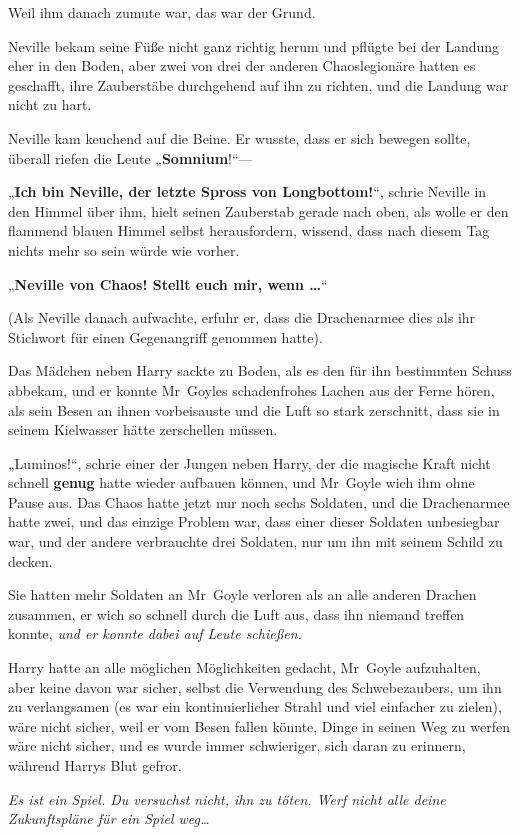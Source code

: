 {Weil ihm danach zumute war, das war der Grund.

Neville bekam seine Füße nicht ganz richtig herum und pflügte bei der Landung eher in den Boden, aber zwei von drei der anderen Chaoslegionäre hatten es geschafft, ihre Zauberstäbe durchgehend auf ihn zu richten, und die Landung war nicht zu hart.

Neville kam keuchend auf die Beine. Er wusste, dass er sich bewegen sollte, überall riefen die Leute „\textbf{Somnium}!“—

„\textbf{Ich bin Neville, der letzte Spross von Longbottom!}“, schrie Neville in den Himmel über ihm, hielt seinen Zauberstab gerade nach oben, als wolle er den flammend blauen Himmel selbst herausfordern, wissend, dass nach diesem Tag nichts mehr so sein würde wie vorher.

„\textbf{Neville von Chaos! Stellt euch mir, wenn …}“

(Als Neville danach aufwachte, erfuhr er, dass die Drachenarmee dies als ihr Stichwort für einen Gegenangriff genommen hatte).

Das Mädchen neben Harry sackte zu Boden, als es den für ihn bestimmten Schuss abbekam, und er konnte Mr~Goyles schadenfrohes Lachen aus der Ferne hören, als sein Besen an ihnen vorbeisauste und die Luft so stark zerschnitt, dass sie in seinem Kielwasser hätte zerschellen müssen.

„Luminos!“, schrie einer der Jungen neben Harry, der die magische Kraft nicht schnell \textbf{genug} hatte wieder aufbauen können, und Mr~Goyle wich ihm ohne Pause aus. Das Chaos hatte jetzt nur noch sechs Soldaten, und die Drachenarmee hatte zwei, und das einzige Problem war, dass einer dieser Soldaten unbesiegbar war, und der andere verbrauchte drei Soldaten, nur um ihn mit seinem Schild zu decken.

Sie hatten mehr Soldaten an Mr~Goyle verloren als an alle anderen Drachen zusammen, er wich so schnell durch die Luft aus, dass ihn niemand treffen konnte, \emph{und er konnte dabei auf Leute schießen.}

Harry hatte an alle möglichen Möglichkeiten gedacht, Mr~Goyle aufzuhalten, aber keine davon war sicher, selbst die Verwendung des Schwebezaubers, um ihn zu verlangsamen (es war ein kontinuierlicher Strahl und viel einfacher zu zielen), wäre nicht sicher, weil er vom Besen fallen könnte, Dinge in seinen Weg zu werfen wäre nicht sicher, und es wurde immer schwieriger, sich daran zu erinnern, während Harrys Blut gefror.

\emph{Es ist ein Spiel. Du versuchst nicht, ihn zu töten. Werf nicht alle deine Zukunftspläne für ein Spiel weg…}

}
